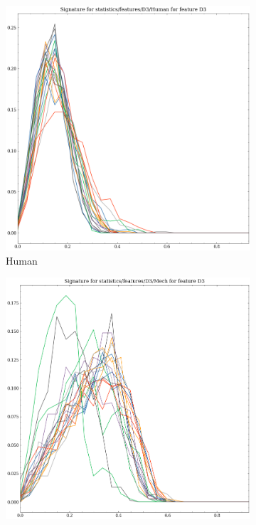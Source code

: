 \begin{figure}[t!p]
    \begin{subfigure}[b]{0.23\textwidth}
        \includegraphics[width=\textwidth]{assets/feature_extraction/D3/Human.png}
        \caption{Human}
    \end{subfigure}
    \hfill
    \begin{subfigure}[b]{0.23\textwidth}
        \includegraphics[width=\textwidth]{assets/feature_extraction/D3/Mech.png}

\end{subfigure}
\end{figure}
